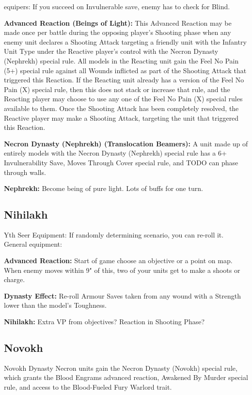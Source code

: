 \begin{multicols}{2}
equipers: If you succeed on Invulnerable save, enemy has to check for Blind.

\textbf{Advanced Reaction (Beings of Light):} This Advanced Reaction may be made once per battle during the opposing player’s Shooting phase when any enemy unit declares a Shooting Attack targeting a friendly unit with the Infantry Unit Type under the Reactive player’s control with the Necron Dynasty (Nephrekh) special rule. All models in the Reacting unit gain the Feel No Pain (5+) special rule against all Wounds inflicted as part of the Shooting Attack that triggered this Reaction. If the Reacting unit already has a version of the Feel No Pain (X) special rule, then this does not stack or increase that rule, and the Reacting player may choose to use any one of the Feel No Pain (X) special rules available to them. Once the Shooting Attack has been completely resolved, the Reactive player may make a Shooting Attack, targeting the unit that triggered this Reaction.

\textbf{Necron Dynasty (Nephrekh) (Translocation Beamers):} A unit made up of entirely models with the Necron Dynasty (Nephrekh) special rule has a 6+ Invulnerability Save, Moves Through Cover special rule, and TODO can phase through walls.

\textbf{Nephrekh:} Become being of pure light. Lots of buffs for one turn.


\newpage
\subsection{Nihilakh}

Yth Seer Equipment: If randomly determining scenario, you can re-roll it.
General equipment: 

\textbf{Advanced Reaction:} Start of game choose an objective or a point on map. When enemy moves within 9" of this, two of your units get to make a shoots or charge.

\textbf{Dynasty Effect:} Re-roll Armour Saves taken from any wound with a Strength lower than the model's Toughness.

\textbf{Nihilakh:} Extra VP from objectives? Reaction in Shooting Phase?


\newpage
\subsection{Novokh}

Novokh Dynasty Necron units gain the Necron Dynasty (Novokh) special rule, which grants the Blood Engrams advanced reaction, Awakened By Murder special rule, and access to the Blood-Fueled Fury Warlord trait.


\end{multicols}
